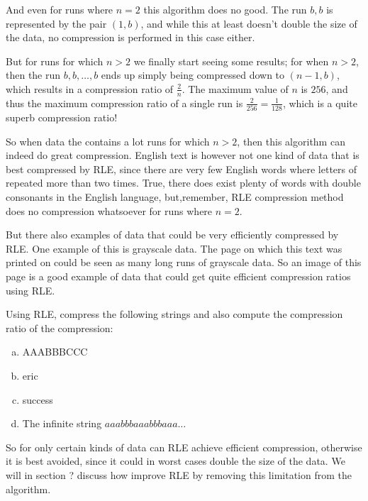 And even for runs where $n=2$ this algorithm does no good. The run
$b,b$ is represented by the pair $(1,b)$, and while this at least
doesn't double the size of the data, no compression is performed in
this case either.

But for runs for which $n > 2$ we finally start seeing some results;
for when $n > 2$, then the run $b, b, \dots, b$ ends up simply being
compressed down to $(n-1,b)$, which results in a compression ratio of
$\frac{2}{n}$. The maximum value of $n$ is $256$, and thus the maximum
compression ratio of a single run is $\frac{2}{256} = \frac{1}{128}$,
which is a quite superb compression ratio!

So when data the contains a lot runs for which $n > 2$, then this
algorithm can indeed do great compression. English text is however not
one kind of data that is best compressed by RLE, since there are very
few English words where letters of repeated more than two times. True,
there does exist plenty of words with double consonants in the English
language, but,remember, RLE compression method does no compression
whatsoever for runs where $n=2$.

But there also examples of data that could be very efficiently
compressed by RLE. One example of this is grayscale data. The page on
which this text was printed on could be seen as many long runs of
grayscale data. So an image of this page is a good example of data
that could get quite efficient compression ratios using RLE.

\begin{Exercise}[label={rle-compression}]
  Using RLE, compress the following strings and also compute the
  compression ratio of the compression:

  \begin{enumerate}[(a)]
  \item AAABBBCCC
  \item eric
  \item success
  \item The infinite string $aaabbbaaabbbaaa\dots$
  \end{enumerate}

\end{Exercise}

So for only certain kinds of data can RLE achieve efficient
compression, otherwise it is best avoided, since it could in worst
cases double the size of the data. We will in section ? discuss how
improve RLE by removing this limitation from the algorithm.


